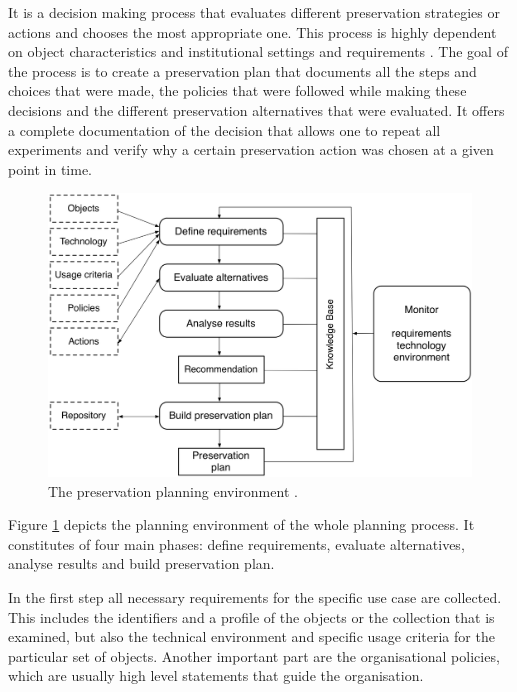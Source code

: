 It is a decision making process that evaluates different preservation strategies or actions and chooses the most appropriate one. This process is highly dependent on object characteristics and institutional settings and requirements \cite{STR07_jcdl}. The goal of the process is to create a preservation plan that documents all the steps and choices that were made, the policies that were followed while making these decisions and the different preservation alternatives that were evaluated. It offers a complete documentation of the decision that allows one to repeat all experiments and verify why a certain preservation action was chosen at a given point in time.

\begin{figure}[th]
\begin{center}
\includegraphics[width=4.5in]{figures/related/planningenvironment.png}
\caption{The preservation planning environment \cite{becker:2010:trustowrothy}.}
\label{fig:planenv}
\end{center}
\end{figure}

Figure \ref{fig:planenv} depicts the planning environment of the whole planning process. It constitutes of four main phases: define requirements, evaluate alternatives, analyse results and build preservation plan.

In the first step all necessary requirements for the specific use case are collected. This includes the identifiers and a profile of the objects or the collection that is examined, but also the technical environment and specific usage criteria for the particular set of objects. Another important part are the organisational policies, which are usually high level statements
that guide the organisation.

